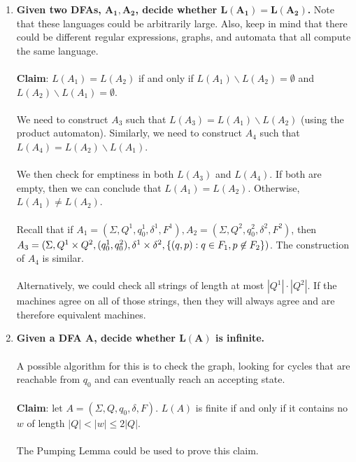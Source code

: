 \documentclass[]{article}
\DeclarePairedDelimiter{\set}{\lbrace}{\rbrace}
\theoremstyle{definition}
\begin{document}
\begin{enumerate}
          \item \textbf{Given two DFAs, $\boldsymbol{A_1, A_2}$, decide whether $\boldsymbol{L(A_1) = L(A_2)}$.} Note that these languages could be arbitrarily large. Also, keep in mind that there could be different regular expressions, graphs, and automata that all compute the same language.
          \\ \\
          \textbf{Claim}: $L(A_1) = L(A_2)$ if and only if $L(A_1) \backslash L(A_2) = \emptyset$ and $L(A_2) \backslash L(A_1) = \emptyset$.
          \\ \\
          We need to construct $A_3$ such that $L(A_3) = L(A_1) \backslash L(A_2)$ (using the product automaton). Similarly, we need to construct $A_4$ such that $L(A_4) = L(A_2) \backslash L(A_1)$.
          \\ \\
          We then check for emptiness in both $L(A_3)$ and $L(A_4)$. If both are empty, then we can conclude that $L(A_1) = L(A_2)$. Otherwise, $L(A_1) \ne L(A_2)$.
          \\ \\
          Recall that if $A_1 = (\Sigma, Q^1, q_0^1, \delta^1, F^1), A_2 = (\Sigma, Q^2, q_0^2, \delta^2, F^2)$, then $A_3 = (\Sigma, Q^1 \times Q^2, (q_0^1, q_0^2), \delta^1 \times \delta^2, \set{ (q, p) : q \in F_1, p \not \in F_2 })$. The construction of $A_4$ is similar.
          \\ \\
          Alternatively, we could check all strings of length at most $|Q^1| \cdot |Q^2|$. If the machines agree on all of those strings, then they will always agree and are therefore equivalent machines.

          \item \textbf{Given a DFA $\boldsymbol{A}$, decide whether $\boldsymbol{L(A)}$ is infinite.}
          \\ \\
          A possible algorithm for this is to check the graph, looking for cycles that are reachable from $q_0$ and can eventually reach an accepting state.
          \\ \\
          \textbf{Claim}: let $A = (\Sigma, Q, q_0, \delta, F)$. $L(A)$ is finite if and only if it contains no $w$ of length $|Q| < |w| \le 2|Q|$.
          \\ \\
          The Pumping Lemma could be used to prove this claim.
        \end{enumerate}
\end{document}
